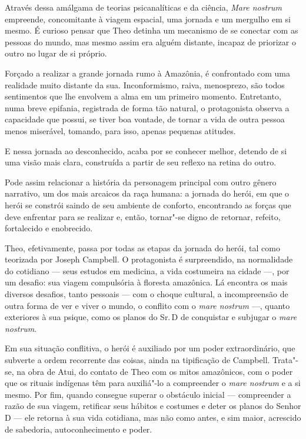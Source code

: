 Através dessa amálgama de teorias psicanalíticas e da ciência, 
\emph{Mare nostrum} empreende, concomitante à viagem espacial, uma jornada e um mergulho em si mesmo.
É curioso pensar que Theo detinha um mecanismo de se conectar com as
pessoas do mundo, mas mesmo assim era alguém distante, incapaz de
priorizar o outro no lugar de si próprio.

Forçado a realizar a grande jornada rumo à Amazônia, é confrontado com
uma realidade muito distante da sua. Inconformismo, raiva, menosprezo,
são todos sentimentos que lhe envolvem a alma em um primeiro momento.
Entretanto, numa breve epifania, registrada de forma tão natural, o
protagonista observa a capacidade que possui, se tiver boa vontade, de
tornar a vida de outra pessoa menos miserável, tomando, para isso,
apenas pequenas atitudes.

E nessa jornada ao desconhecido, acaba por se conhecer melhor, detendo
de si uma visão mais clara, construída a partir de seu reflexo na retina
do outro. 

Pode assim relacionar a história da personagem principal com outro gênero narrativo, um dos mais arcaicos da raça humana: a jornada do herói, em que o herói se constrói saindo de seu ambiente de conforto,
encontrando as forças que deve enfrentar para se realizar e, então,
tornar"-se digno de retornar, refeito, fortalecido e enobrecido.

Theo, efetivamente, passa por todas as etapas da jornada do herói, tal como teorizada por Joseph Campbell. O protagonista é surpreendido, na normalidade do cotidiano --- seus estudos em medicina, a vida costumeira na cidade ---, por um desafio: sua viagem compulsória à floresta amazônica. Lá encontra os mais diversos desafios, tanto pessoais --- com o choque cultural, a incompreensão de outra forma de ver e viver o mundo, o conflito com o \textit{mare nostrum} ---, quanto exteriores à sua psique, como os planos do Sr.\,D de conquistar e subjugar o \textit{mare nostrum}.

Em sua situação conflitiva, o herói é auxiliado por um poder extraordinário, que subverte a ordem recorrente das coisas, ainda na tipificação de Campbell. Trata"-se, na obra de Atui, do contato de Theo com os mitos amazônicos, com o poder que os rituais indígenas têm para auxiliá"-lo a compreender o \textit{mare nostrum} e a si mesmo. Por fim, quando consegue superar o obstáculo inicial --- compreender a razão de sua viagem, retificar seus hábitos e costumes e deter os planos do Senhor D --- ele retorna à sua vida cotidiana, mas não como antes, e sim maior, acrescido de sabedoria, autoconhecimento e poder.


